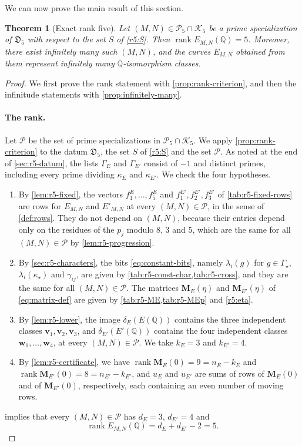 \documentclass[12pt,oneside,openany]{book}
\theoremstyle{definition}
\theoremstyle{plain}
\numberwithin{equation}{chapter}
\theoremstyle{plain}
\newtheorem{theorem}{Theorem}[chapter]
\theoremstyle{definition}
\theoremstyle{remark}
\newcommand{\Q}{\mathbb Q}
\newcommand{\Qbar}{\overline{\mathbb Q}}
\DeclareMathOperator{\rk}{rank}
\newcommand{\datum}{\mathfrak D}
\newcommand{\cP}{\mathcal P}
\newcommand{\cK}{\mathcal K}
\begin{document}
We can now prove the main result of this section.

\begin{theorem}[Exact rank five]\label{thm:r5}
Let $(M,N)\in\cP_5\cap\cK_5$ be a prime specialization of $\datum_5$ with respect to the set $S$ of \eqref{r5:S}. Then $\rk E_{M,N}(\Q)=5$. Moreover, there exist infinitely many such $(M,N)$, and the curves $E_{M,N}$ obtained from them represent infinitely many $\Qbar$-isomorphism classes.
\end{theorem}

\begin{proof}
We first prove the rank statement with \cref{prop:rank-criterion}, and then the infinitude statements with \cref{prop:infinitely-many}.

\paragraph{The rank.} Let $\cP$ be the set of prime specializations in $\cP_5\cap\cK_5$. We apply \cref{prop:rank-criterion} to the datum $\datum_5$, the set $S$ of \eqref{r5:S} and the set $\cP$. As noted at the end of \cref{sec:r5-datum}, the lists $\Gamma_E$ and $\Gamma_{E'}$ consist of $-1$ and distinct primes, including every prime dividing $\kappa_E$ and $\kappa_{E'}$. We check the four hypotheses.
\begin{enumerate}[label=(\roman*)]
\item By \cref{lem:r5-fixed}, the vectors $f^E_1,\dots,f^E_5$ and $f^{E'}_1,f^{E'}_2,f^{E'}_3$ of \cref{tab:r5-fixed-rows} are rows for $E_{M,N}$ and $E'_{M,N}$ at every $(M,N)\in\cP$, in the sense of \cref{def:rows}. They do not depend on $(M,N)$, because their entries depend only on the residues of the $p_j$ modulo $8$, $3$ and $5$, which are the same for all $(M,N)\in\cP$ by \cref{lem:r5-progression}.
\item By \cref{sec:r5-characters}, the bits \eqref{eq:constant-bits}, namely $\lambda_i(g)$ for $g\in\Gamma_\star$, $\lambda_i(\kappa_\star)$ and $\gamma_{ij}$, are given by \cref{tab:r5-const-char,tab:r5-cross}, and they are the same for all $(M,N)\in\cP$. The matrices $\mathbf M_E(\eta)$ and $\mathbf M_{E'}(\eta)$ of \eqref{eq:matrix-def} are given by \cref{tab:r5-ME,tab:r5-MEp} and \eqref{r5:eta}.
\item By \cref{lem:r5-lower}, the image $\delta_E(E(\Q))$ contains the three independent classes $\mathbf v_1,\mathbf v_2,\mathbf v_3$, and $\delta_{E'}(E'(\Q))$ contains the four independent classes $\mathbf w_1,\dots,\mathbf w_4$, at every $(M,N)\in\cP$. We take $k_E=3$ and $k_{E'}=4$.
\item By \cref{lem:r5-certificate}, we have $\rk\mathbf M_E(0)=9=n_E-k_E$ and $\rk\mathbf M_{E'}(0)=8=n_{E'}-k_{E'}$, and $u_E$ and $u_{E'}$ are sums of rows of $\mathbf M_E(0)$ and of $\mathbf M_{E'}(0)$, respectively, each containing an even number of moving rows.
\end{enumerate}
 implies that every $(M,N)\in\cP$ has $d_E=3$, $d_{E'}=4$ and
\[
\rk E_{M,N}(\Q)=d_E+d_{E'}-2=5.
\]


\end{proof}
\end{document}
